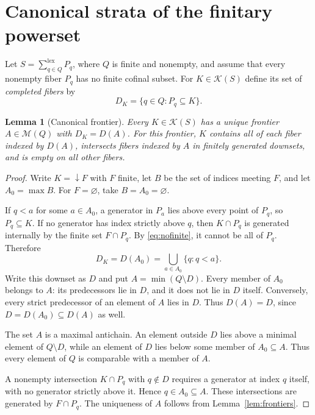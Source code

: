 \documentclass[11pt,a4paper]{article}
\newtheorem{lemma}[theorem]{Lemma}
\theoremstyle{definition}
\theoremstyle{remark}
\newcommand{\K}{\mathcal K}
\newcommand{\M}{\mathcal M}
\begin{document}
\section{Canonical strata of the finitary powerset}\label{sec:canonical}

Let $S=\sum_{q\in Q}^{\mathrm{lex}}P_q$, where $Q$ is finite and nonempty,
and assume that every nonempty fiber $P_q$ has no finite cofinal subset.
For $K\in\K(S)$ define its set of \emph{completed fibers} by
\[
 D_K=\{q\in Q:P_q\subseteq K\}.
\]

\begin{lemma}[Canonical frontier]\label{lem:canonical}
Every $K\in\K(S)$ has a unique frontier $A\in\M(Q)$ with $D_K=D(A)$.
For this frontier, $K$ contains all of each fiber indexed by $D(A)$,
intersects fibers indexed by $A$ in finitely generated downsets, and is
empty on all other fibers.
\end{lemma}

\begin{proof}
Write $K=\downarrow F$ with $F$ finite, let $B$ be the set of indices
meeting $F$, and let $A_0=\max B$. For $F=\varnothing$, take
$B=A_0=\varnothing$.

If $q<a$ for some $a\in A_0$, a generator in $P_a$ lies above every point
of $P_q$, so $P_q\subseteq K$. If no generator has index strictly above
$q$, then $K\cap P_q$ is generated internally by the finite set
$F\cap P_q$. By \eqref{eq:nofinite}, it cannot be all of $P_q$. Therefore
\begin{equation}\label{eq:Dsupport}
 D_K=D(A_0)=\bigcup_{a\in A_0}\{q:q<a\}.
\end{equation}
Write this downset as $D$ and put $A=\min(Q\setminus D)$. Every member of
$A_0$ belongs to $A$: its predecessors lie in $D$, and it does not lie in
$D$ itself. Conversely, every strict predecessor of an element of $A$
lies in $D$. Thus $D(A)=D$, since $D=D(A_0)\subseteq D(A)$ as well.

The set $A$ is a maximal antichain. An element outside $D$ lies above a
minimal element of $Q\setminus D$, while an element of $D$ lies below
some member of $A_0\subseteq A$. Thus every element of $Q$ is comparable
with a member of $A$.

A nonempty intersection $K\cap P_q$ with $q\notin D$ requires a generator
at index $q$ itself, with no generator strictly above it. Hence
$q\in A_0\subseteq A$. These intersections are generated by $F\cap P_q$.
The uniqueness of $A$ follows from Lemma~\ref{lem:frontiers}.
\end{proof}
\end{document}
